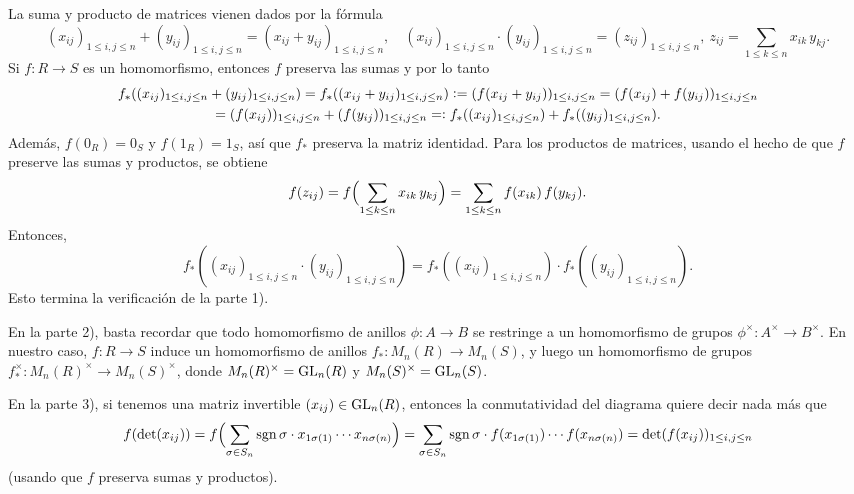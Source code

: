 \begin{ejercicio}
  \ifdefined\solutions
  \begin{solucion}
    La suma y producto de matrices vienen dados por la fórmula
    \[ (x_{ij})_{1 \le i,j\le n} + (y_{ij})_{1 \le i,j\le n} =
       (x_{ij} + y_{ij})_{1 \le i,j\le n}, \quad
       (x_{ij})_{1 \le i,j\le n}\cdot (y_{ij})_{1 \le i,j\le n} =
       (z_{ij})_{1 \le i,j\le n}, ~ z_{ij} =
       \sum_{1\le k\le n} x_{ik}\,y_{kj}. \]
    Si $f\colon R\to S$ es un homomorfismo, entonces $f$ preserva las sumas y
    por lo tanto
    \begin{multline*}
      f_* ((x_{ij})_{1 \le i,j\le n} + (y_{ij})_{1 \le i,j\le n}) =
      f_* ((x_{ij} + y_{ij})_{1 \le i,j\le n}) \mathrel{\mathop:}= (f (x_{ij} + y_{ij}))_{1 \le i,j\le n} =
      (f (x_{ij}) + f (y_{ij}))_{1 \le i,j\le n} \\
      = (f (x_{ij}))_{1 \le i,j\le n} + (f (y_{ij}))_{1 \le i,j\le n} =\mathrel{\mathop:}
      f_* ((x_{ij})_{1 \le i,j\le n}) + f_* ((y_{ij})_{1 \le i,j\le n}).
    \end{multline*}
    Además, $f (0_R) = 0_S$ y $f (1_R) = 1_S$, así que $f_*$ preserva la matriz
    identidad. Para los productos de matrices, usando el hecho de que $f$
    preserve las sumas y productos, se obtiene
    \[ f (z_{ij}) = f \Bigl(\sum_{1\le k\le n} x_{ik}\,y_{kj}\Bigr) =
       \sum_{1\le k\le n} f (x_{ik})\,f (y_{kj}). \]
    Entonces,
    \[ f_* ((x_{ij})_{1 \le i,j\le n} \cdot (y_{ij})_{1 \le i,j\le n}) =
       f_* ((x_{ij})_{1 \le i,j\le n}) \cdot f_* ((y_{ij})_{1 \le i,j\le n}). \]
    Esto termina la verificación de la parte 1).

    En la parte 2), basta recordar que todo homomorfismo de anillos
    $\phi\colon A\to B$ se restringe a un homomorfismo de grupos
    $\phi^\times\colon A^\times \to B^\times$. En nuestro caso, $f\colon R\to S$
    induce un homomorfismo de anillos $f_*\colon M_n (R) \to M_n (S)$, y luego
    un homomorfismo de grupos
    $f_*^\times\colon M_n (R)^\times \to M_n (S)^\times$, donde
    $M_n (R)^\times = \operatorname{GL}_n (R)$ y $M_n (S)^\times = \operatorname{GL}_n (S)$.

    En la parte 3), si tenemos una matriz invertible $(x_{ij}) \in \operatorname{GL}_n (R)$,
    entonces la conmutatividad del diagrama quiere decir nada más que
    \[ f (\det (x_{ij}) ) =
       f \Bigl(\sum_{\sigma\in S_n} \operatorname{sgn}\sigma \cdot x_{1\sigma (1)}\cdots x_{n\sigma (n)}\Bigr) =
       \sum_{\sigma\in S_n} \operatorname{sgn}\sigma \cdot f (x_{1\sigma (1)})\cdots f (x_{n\sigma (n)}) =
       \det (f (x_{ij}))_{1\le i,j\le n} \]
    (usando que $f$ preserva sumas y productos).
  \end{solucion}
  \fi
\end{ejercicio}

